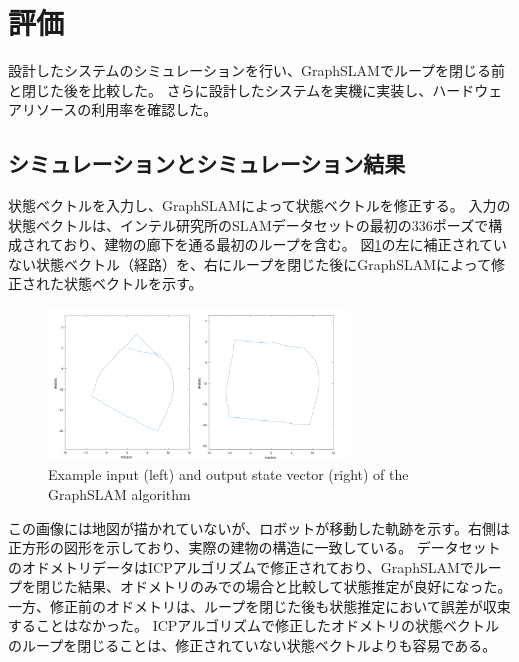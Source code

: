 \documentclass{jsarticle}
\begin{document}
\section{評価}
設計したシステムのシミュレーションを行い、GraphSLAMでループを閉じる前と閉じた後を比較した。
さらに設計したシステムを実機に実装し、ハードウェアリソースの利用率を確認した。

\subsection{シミュレーションとシミュレーション結果}
状態ベクトルを入力し、GraphSLAMによって状態ベクトルを修正する。
入力の状態ベクトルは、インテル研究所のSLAMデータセットの最初の336ポーズで構成されており、建物の廊下を通る最初のループを含む。
図\ref{fig:sim-in-and-out}の左に補正されていない状態ベクトル（経路）を、右にループを閉じた後にGraphSLAMによって修正された状態ベクトルを示す。
\begin{figure}[H]
    \centering
    \includegraphics[width=8cm]{./images/example_input_and_output.png}
    \caption{Example input (left) and output state vector (right) of the GraphSLAM algorithm}\label{fig:sim-in-and-out}
\end{figure}
この画像には地図が描かれていないが、ロボットが移動した軌跡を示す。右側は正方形の図形を示しており、実際の建物の構造に一致している。
データセットのオドメトリデータはICPアルゴリズムで修正されており、GraphSLAMでループを閉じた結果、オドメトリのみでの場合と比較して状態推定が良好になった。
一方、修正前のオドメトリは、ループを閉じた後も状態推定において誤差が収束することはなかった。
ICPアルゴリズムで修正したオドメトリの状態ベクトルのループを閉じることは、修正されていない状態ベクトルよりも容易である。
\end{document}
